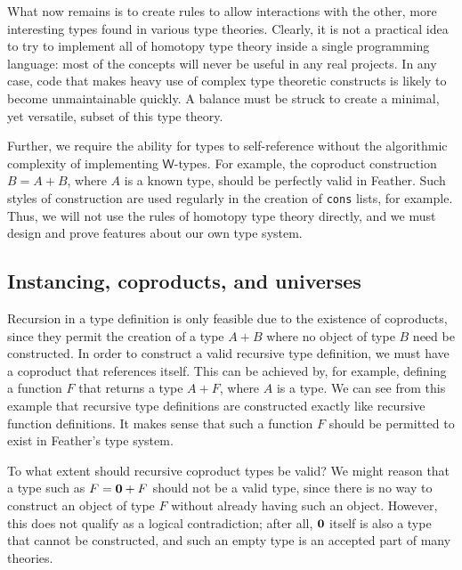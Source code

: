 \documentclass[11pt]{book}
\begin{document}
What now remains is to create rules to allow interactions with the other, more interesting types found in various type theories.
Clearly, it is not a practical idea to try to implement all of homotopy type theory inside a single programming language: most of the concepts will never be useful in any real projects.
In any case, code that makes heavy use of complex type theoretic constructs is likely to become unmaintainable quickly.
A balance must be struck to create a minimal, yet versatile, subset of this type theory.

Further, we require the ability for types to self-reference without the algorithmic complexity of implementing \( \mathsf{W} \)-types.
For example, the coproduct construction \( B = A + B \), where \( A \) is a known type, should be perfectly valid in Feather.
Such styles of construction are used regularly in the creation of \lstinline{cons} lists, for example.
Thus, we will not use the rules of homotopy type theory directly, and we must design and prove features about our own type system.


\subsection{Instancing, coproducts, and universes}

Recursion in a type definition is only feasible due to the existence of coproducts, since they permit the creation of a type \( A + B \) where no object of type \( B \) need be constructed.
In order to construct a valid recursive type definition, we must have a coproduct that references itself.
This can be achieved by, for example, defining a function \( F \) that returns a type \( A + F \), where \( A \) is a type.
We can see from this example that recursive type definitions are constructed exactly like recursive function definitions.
It makes sense that such a function \( F \) should be permitted to exist in Feather's type system.

To what extent should recursive coproduct types be valid?
We might reason that a type such as \( F = \mathbf{0} + F \) should not be a valid type, since there is no way to construct an object of type \( F \) without already having such an object.
However, this does not qualify as a logical contradiction; after all, \( \mathbf{0} \) itself is also a type that cannot be constructed, and such an empty type is an accepted part of many theories.
\end{document}
